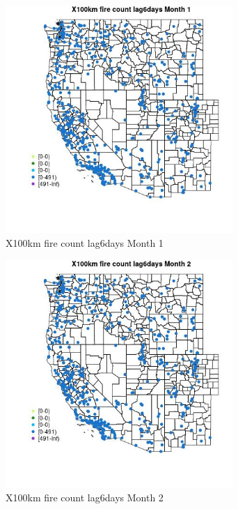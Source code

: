 \begin{figure} 
\centering  
\includegraphics[width=0.77\textwidth]{Code_Outputs/Report_ML_input_PM25_Step4_part_e_de_duplicated_aves_compiled_2019-05-14wNAs_MapObsMo1X100km_fire_count_lag6days.jpg} 
\caption{\label{fig:Report_ML_input_PM25_Step4_part_e_de_duplicated_aves_compiled_2019-05-14wNAsMapObsMo1X100km_fire_count_lag6days}X100km fire count lag6days Month 1} 
\end{figure} 
 

\begin{figure} 
\centering  
\includegraphics[width=0.77\textwidth]{Code_Outputs/Report_ML_input_PM25_Step4_part_e_de_duplicated_aves_compiled_2019-05-14wNAs_MapObsMo2X100km_fire_count_lag6days.jpg} 
\caption{\label{fig:Report_ML_input_PM25_Step4_part_e_de_duplicated_aves_compiled_2019-05-14wNAsMapObsMo2X100km_fire_count_lag6days}X100km fire count lag6days Month 2} 
\end{figure} 
 


